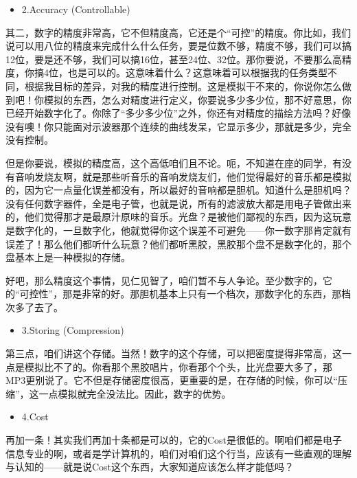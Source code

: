 \documentclass[a4paper,12pt]{article}
\begin{document}
\begin{itemize}
    \item 2.\quad Accuracy \quad (Controllable)
\end{itemize}

其二，数字的精度非常高，它不但精度高，它还是个“可控”的精度。你比如，我们说可以用八位的精度来完成什么什么任务，要是位数不够，精度不够，我们可以搞12位，要是还不够，我们可以搞16位，甚至24位、32位。那你要说，不要那么高精度，你搞4位，也是可以的。这意味着什么？这意味着可以根据我的任务类型不同，根据我目标的差异，对我的精度进行控制。这是模拟干不来的，你说你怎么做到吧！你模拟的东西，怎么对精度进行定义，你要说多少多少位，那不好意思，你已经开始数字化了。你除了“多少多少位”之外，你还有对精度的描绘方法吗？好像没有噢！你只能面对示波器那个连续的曲线发呆，它显示多少，那就是多少，完全没有控制。

但是你要说，模拟的精度高，这个高低咱们且不论。呃，不知道在座的同学，有没有音响发烧友啊，就是那些听音乐的音响发烧友们，他们觉得最好的音乐都是模拟的，因为它一点量化误差都没有，所以最好的音响都是胆机。知道什么是胆机吗？没有任何数字器件，全是电子管，也就是说，所有的滤波放大都是用电子管做出来的，他们觉得那才是最原汁原味的音乐。光盘？是被他们鄙视的东西，因为这玩意是数字化的，一旦数字化，他就觉得你这个误差不可避免——你一数字那肯定就有误差了！那么他们都听什么玩意？他们都听黑胶，黑胶那个盘不是数字化的，那个盘基本上是一种模拟的存储。

好吧，那么精度这个事情，见仁见智了，咱们暂不与人争论。至少数字的，它的“可控性”，那是非常的好。那胆机基本上只有一个档次，那数字化的东西，那档次多了去了。

\begin{itemize}
    \item 3.\quad Storing \quad (Compression)
\end{itemize}

第三点，咱们讲这个存储。当然！数字的这个存储，可以把密度提得非常高，这一点是模拟比不了的。你看那个黑胶唱片，你看那个个头，比光盘要大多了，那MP3更别说了。它不但是存储密度很高，更重要的是，在存储的时候，你可以“压缩”，这一点模拟就完全没法比。因此，数字的优势。

\begin{itemize}
    \item 4.\quad Cost \quad 
\end{itemize}

再加一条！其实我们再加十条都是可以的，它的Cost是很低的。啊咱们都是电子信息专业的啊，或者是学计算机的，咱们对咱们这个行当，应该有一些直观的理解与认知的——就是说Cost这个东西，大家知道应该怎么样才能低吗？
\end{document}

